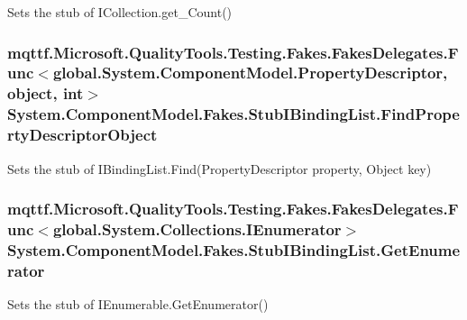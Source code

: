Sets the stub of I\-Collection.\-get\-\_\-\-Count()

\hypertarget{class_system_1_1_component_model_1_1_fakes_1_1_stub_i_binding_list_ab4f33ec59879c244dce5aded913ade63}{
\subsubsection[{Find\-Property\-Descriptor\-Object}]{\setlength{\rightskip}{0pt plus 5cm}mqttf.\-Microsoft.\-Quality\-Tools.\-Testing.\-Fakes.\-Fakes\-Delegates.\-Func$<$global.\-System.\-Component\-Model.\-Property\-Descriptor, object, int$>$ System.\-Component\-Model.\-Fakes.\-Stub\-I\-Binding\-List.\-Find\-Property\-Descriptor\-Object}}\label{class_system_1_1_component_model_1_1_fakes_1_1_stub_i_binding_list_ab4f33ec59879c244dce5aded913ade63}


Sets the stub of I\-Binding\-List.\-Find(\-Property\-Descriptor property, Object key)

\hypertarget{class_system_1_1_component_model_1_1_fakes_1_1_stub_i_binding_list_ab3431e341cfe4d43e017d918f8680541}{
\subsubsection[{Get\-Enumerator}]{\setlength{\rightskip}{0pt plus 5cm}mqttf.\-Microsoft.\-Quality\-Tools.\-Testing.\-Fakes.\-Fakes\-Delegates.\-Func$<$global.\-System.\-Collections.\-I\-Enumerator$>$ System.\-Component\-Model.\-Fakes.\-Stub\-I\-Binding\-List.\-Get\-Enumerator}}\label{class_system_1_1_component_model_1_1_fakes_1_1_stub_i_binding_list_ab3431e341cfe4d43e017d918f8680541}


Sets the stub of I\-Enumerable.\-Get\-Enumerator()

